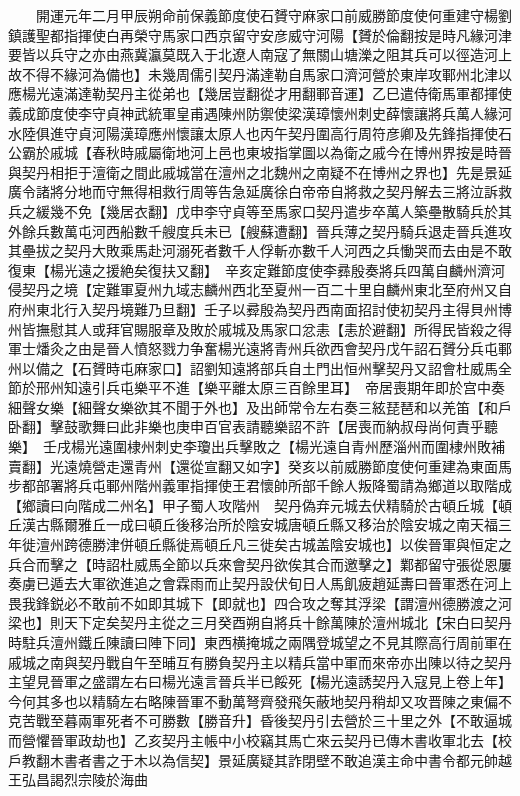 　　開運元年二月甲辰朔命前保義節度使石贇守麻家口前威勝節度使何重建守楊劉鎮護聖都指揮使白再榮守馬家口西京留守安彦威守河陽【贇於倫翻按是時凡緣河津要皆以兵守之亦由燕冀瀛莫既入于北遼人南寇了無關山塘濼之阻其兵可以徑造河上故不得不緣河為備也】未幾周儒引契丹滿達勒自馬家口濟河營於東岸攻鄆州北津以應楊光遠滿達勒契丹主從弟也【幾居豈翻從才用翻鄆音運】乙巳遣侍衛馬軍都揮使義成節度使李守貞神武統軍皇甫遇陳州防禦使梁漢璋懷州刺史薛懷讓將兵萬人緣河水陸俱進守貞河陽漢璋應州懷讓太原人也丙午契丹圍高行周符彦卿及先鋒指揮使石公霸於戚城【春秋時戚屬衛地河上邑也東坡指掌圖以為衛之戚今在博州界按是時晉與契丹相拒于澶衛之間此戚城當在澶州之北魏州之南疑不在博州之界也】先是景延廣令諸將分地而守無得相救行周等告急延廣徐白帝帝自將救之契丹解去三將泣訴救兵之緩幾不免【幾居衣翻】戊申李守貞等至馬家口契丹遣步卒萬人築壘散騎兵於其外餘兵數萬屯河西船數千艘度兵未已【艘蘇遭翻】晉兵薄之契丹騎兵退走晉兵進攻其壘拔之契丹大敗乘馬赴河溺死者數千人俘斬亦數千人河西之兵慟哭而去由是不敢復東【楊光遠之援絶矣復扶又翻】　辛亥定難節度使李彞殷奏將兵四萬自麟州濟河侵契丹之境【定難軍夏州九域志麟州西北至夏州一百二十里自麟州東北至府州又自府州東北行入契丹境難乃旦翻】壬子以彛殷為契丹西南面招討使初契丹主得貝州博州皆撫慰其人或拜官賜服章及敗於戚城及馬家口忿恚【恚於避翻】所得民皆殺之得軍士燔灸之由是晉人憤怒戮力争奮楊光遠將青州兵欲西會契丹戊午詔石贇分兵屯鄆州以備之【石贇時屯麻家口】詔劉知遠將部兵自土門出恒州擊契丹又詔會杜威馬全節於邢州知遠引兵屯樂平不進【樂平離太原三百餘里耳】　帝居喪期年即於宫中奏細聲女樂【細聲女樂欲其不聞于外也】及出師常令左右奏三絃琵琶和以羌笛【和戶卧翻】擊鼓歌舞曰此非樂也庚申百官表請聽樂詔不許【居喪而納叔母尚何責乎聽樂】　壬戌楊光遠圍棣州刺史李瓊出兵擊敗之【楊光遠自青州歷淄州而圍棣州敗補賣翻】光遠燒營走還青州【還從宣翻又如字】癸亥以前威勝節度使何重建為東面馬步都部署將兵屯鄆州階州義軍指揮使王君懷帥所部千餘人叛降蜀請為鄉道以取階成【鄉讀曰向階成二州名】甲子蜀人攻階州　契丹偽弃元城去伏精騎於古頓丘城【頓丘漢古縣爾雅丘一成曰頓丘後移治所於陰安城唐頓丘縣又移治於陰安城之南天福三年徙澶州跨德勝津併頓丘縣徙焉頓丘凡三徙矣古城盖陰安城也】以俟晉軍與恒定之兵合而擊之【時詔杜威馬全節以兵來會契丹欲俟其合而邀擊之】鄴都留守張從恩屢奏虜已遁去大軍欲進追之會霖雨而止契丹設伏旬日人馬飢疲趙延夀曰晉軍悉在河上畏我鋒鋭必不敢前不如即其城下【即就也】四合攻之奪其浮梁【謂澶州德勝渡之河梁也】則天下定矣契丹主從之三月癸酉朔自將兵十餘萬陳於澶州城北【宋白曰契丹時駐兵澶州鐵丘陳讀曰陣下同】東西横掩城之兩隅登城望之不見其際高行周前軍在戚城之南與契丹戰自午至晡互有勝負契丹主以精兵當中軍而來帝亦出陳以待之契丹主望見晉軍之盛謂左右曰楊光遠言晉兵半已餒死【楊光遠誘契丹入寇見上卷上年】今何其多也以精騎左右略陳晉軍不動萬弩齊發飛矢蔽地契丹稍却又攻晋陳之東偏不克苦戰至暮兩軍死者不可勝數【勝音升】昏後契丹引去營於三十里之外【不敢逼城而營懼晉軍政劫也】乙亥契丹主帳中小校竊其馬亡來云契丹已傳木書收軍北去【校戶教翻木書者書之于木以為信契】景延廣疑其詐閉壁不敢追漢主命中書令都元帥越王弘昌謁烈宗陵於海曲

